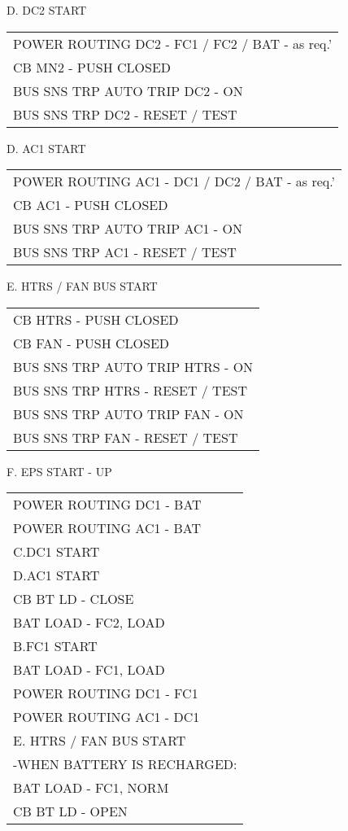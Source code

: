 \documentclass[Orbiter User Manual.tex]{subfiles}
\begin{document}
\noindent
D. DC2 START
	\begin{longtable}{ p{\textwidth} }
	POWER ROUTING DC2 - FC1 / FC2 / BAT - as req.'\\
	CB MN2 - PUSH CLOSED\\
	BUS SNS TRP AUTO TRIP DC2 - ON\\
	BUS SNS TRP DC2 - RESET / TEST
	\end{longtable}

\noindent
D. AC1 START
	\begin{longtable}{ p{\textwidth} }
	POWER ROUTING AC1 - DC1 / DC2 / BAT - as req.'\\
	CB AC1 - PUSH CLOSED\\
	BUS SNS TRP AUTO TRIP AC1 - ON\\
	BUS SNS TRP AC1 - RESET / TEST
	\end{longtable}

\noindent
E. HTRS / FAN BUS START
	\begin{longtable}{ p{\textwidth} }
	CB HTRS - PUSH CLOSED\\
	CB FAN - PUSH CLOSED\\
	BUS SNS TRP AUTO TRIP HTRS - ON\\
	BUS SNS TRP HTRS - RESET / TEST\\
	BUS SNS TRP AUTO TRIP FAN - ON\\
	BUS SNS TRP FAN - RESET / TEST
	\end{longtable}

\noindent
F. EPS START - UP
	\begin{longtable}{ p{\textwidth} }
	POWER ROUTING DC1 - BAT\\
	POWER ROUTING AC1 - BAT\\
	C.DC1 START\\
	D.AC1 START\\
	CB BT LD - CLOSE\\
	BAT LOAD - FC2, LOAD\\
	B.FC1 START\\
	BAT LOAD - FC1, LOAD\\
	POWER ROUTING DC1 - FC1\\
	POWER ROUTING AC1 - DC1\\
	E. HTRS / FAN BUS START\\
	-WHEN BATTERY IS RECHARGED:\\
	\quad BAT LOAD - FC1, NORM\\
	\quad CB BT LD - OPEN
	\end{longtable}
\end{document}
